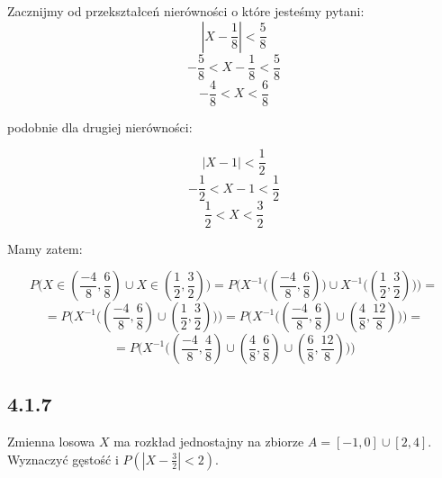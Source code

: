 \documentclass{article}
\begin{document}
Zacznijmy od przekształceń nierówności o które jesteśmy pytani:
\begin{equation*}
    |X - \frac{1}{8}| < \frac{5}{8}
\end{equation*}
\begin{equation*}
    -\frac{5}{8} < X - \frac{1}{8} < \frac{5}{8}
\end{equation*}
\begin{equation*}
    -\frac{4}{8} < X  < \frac{6}{8}
\end{equation*}

podobnie dla drugiej nierówności:

\begin{equation*}
    |X - 1| < \frac{1}{2}
\end{equation*}
\begin{equation*}
    -\frac{1}{2} < X - 1 < \frac{1}{2}
\end{equation*}
\begin{equation*}
    \frac{1}{2} < X  < \frac{3}{2}
\end{equation*}

Mamy zatem:

\begin{equation*}
    P\Big(X \in (\frac{-4}{8}, \frac{6}{8}) \cup X \in (\frac{1}{2}, \frac{3}{2})\Big) 
    = P\Big(X^{-1}\Big((\frac{-4}{8}, \frac{6}{8})\Big) \cup X^{-1}\Big((\frac{1}{2}, \frac{3}{2})\Big)\Big)
    =
\end{equation*}
\begin{equation*}
    = P\Bigg(X^{-1}\Big((\frac{-4}{8}, \frac{6}{8}) \cup (\frac{1}{2}, \frac{3}{2})\Big)\Bigg)
    = P\Bigg(X^{-1}\Big((\frac{-4}{8}, \frac{6}{8}) \cup (\frac{4}{8}, \frac{12}{8})\Big)\Bigg) =
\end{equation*}
\begin{equation*}
    = P\Bigg(X^{-1}\Big((\frac{-4}{8}, \frac{4}{8}) \cup (\frac{4}{8}, \frac{6}{8}) \cup (\frac{6}{8}, \frac{12}{8})\Big)\Bigg)
\end{equation*}


\subsection*{4.1.7}
\begin{center}
    Zmienna losowa \(X\) ma rozkład jednostajny na zbiorze \(A = [-1, 0] \cup [2, 4]\). Wyznaczyć gęstość i \(P(|X - \frac{3}{2}| < 2)\).
\end{center}
\end{document}
